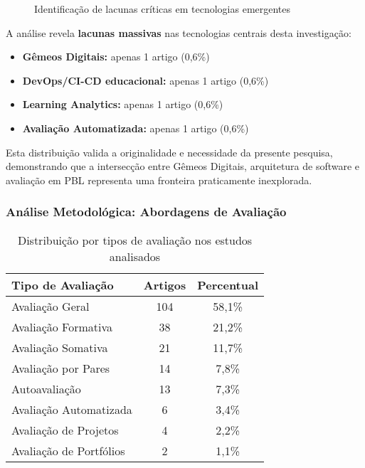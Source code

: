 \documentclass[english, spanish, brazilian]{RBIEarticle} %
\begin{document}
\begin{figure}[htbp]
\centering
{}
\caption{Identificação de lacunas críticas em tecnologias emergentes}
\label{fig:lacunas}
\end{figure}

A análise revela \textbf{lacunas massivas} nas tecnologias centrais desta investigação:
\begin{itemize}
\item \textbf{Gêmeos Digitais:} apenas 1 artigo (0,6\%)
\item \textbf{DevOps/CI-CD educacional:} apenas 1 artigo (0,6\%)  
\item \textbf{Learning Analytics:} apenas 1 artigo (0,6\%)
\item \textbf{Avaliação Automatizada:} apenas 1 artigo (0,6\%)
\end{itemize}

Esta distribuição valida a originalidade e necessidade da presente pesquisa, demonstrando que a intersecção entre Gêmeos Digitais, arquitetura de software e avaliação em PBL representa uma fronteira praticamente inexplorada.

\subsubsection{Análise Metodológica: Abordagens de Avaliação}

\begin{table}[htbp]
\centering
\caption{Distribuição por tipos de avaliação nos estudos analisados}
\label{tab:tipos_avaliacao}
\begin{tabular}{lcc}
\toprule
\textbf{Tipo de Avaliação} & \textbf{Artigos} & \textbf{Percentual} \\
\midrule
Avaliação Geral & 104 & 58,1\% \\
Avaliação Formativa & 38 & 21,2\% \\
Avaliação Somativa & 21 & 11,7\% \\
Avaliação por Pares & 14 & 7,8\% \\
Autoavaliação & 13 & 7,3\% \\
Avaliação Automatizada & 6 & 3,4\% \\
Avaliação de Projetos & 4 & 2,2\% \\
Avaliação de Portfólios & 2 & 1,1\% \\
\bottomrule
\end{tabular}
\end{table}
\end{document}
